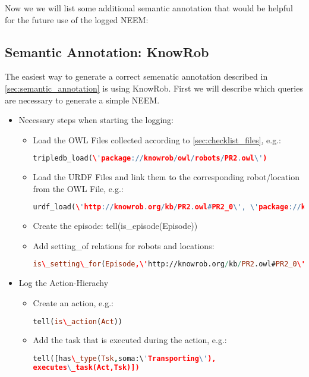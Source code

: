 Now we we will list some additional semantic annotation that would be helpful for the future use of the logged NEEM:


\subsection{Semantic Annotation: KnowRob}

The easiest way to generate a correct semenatic annotation described in \ref{sec:semantic_annotation} is using KnowRob. First we will describe which queries are necessary to generate a simple NEEM.

\begin{itemize}
	\item Necessary steps when starting the logging:
	\begin{itemize}
		\item Load the OWL Files collected according to \ref{sec:checklist_files}, e.g.: 
			\begin{lstlisting}[language=Prolog]
tripledb_load(\'package://knowrob/owl/robots/PR2.owl\')
			\end{lstlisting}
		\item Load the URDF Files and link them to the corresponding robot/location from the OWL File, e.g.:
		\begin{lstlisting}[language=Prolog]
urdf_load(\'http://knowrob.org/kb/PR2.owl#PR2_0\', \'package://knowrob/urdf/pr2.urdf\', [load_rdf])
		\end{lstlisting}
		\item Create the episode: tell(is\_episode(Episode))
		\item Add setting\_of relations for robots and locations: 
		\begin{lstlisting}[language=Prolog]
is\_setting\_for(Episode,\'http://knowrob.org/kb/PR2.owl#PR2_0\')
		\end{lstlisting}
	\end{itemize}
	\item Log the Action-Hierachy
	\begin{itemize}
		\item Create an action, e.g.:
			\begin{lstlisting}[language=Prolog]
tell(is\_action(Act))
			\end{lstlisting}
		\item Add the task that is executed during the action, e.g.: 
			\begin{lstlisting}[language=Prolog]
tell([has\_type(Tsk,soma:\'Transporting\'),
executes\_task(Act,Tsk)])

\end{lstlisting}
\end{itemize}
\end{itemize}
